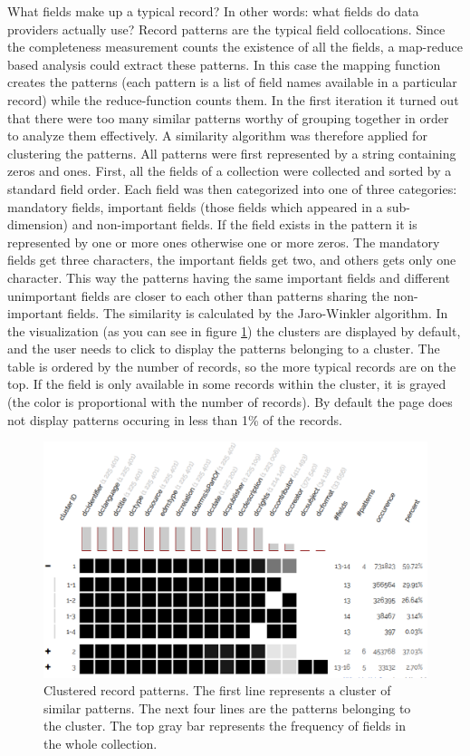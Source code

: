 What fields make up a typical record? In other words: what fields do data providers actually use? Record patterns are the typical field collocations. Since the completeness measurement counts the existence of all the fields, a map-reduce based analysis could extract these patterns. In this case the mapping function creates the patterns (each pattern is a list of field names available in a particular record) while the reduce-function counts them. In the first iteration it turned out that there were too many similar patterns worthy of grouping together in order to analyze them effectively. A similarity algorithm was therefore applied for clustering the patterns. All patterns were first represented by a string containing zeros and ones. First, all the fields of a collection were collected and sorted by a standard field order. Each field was then categorized into one of three categories: mandatory fields, important fields (those fields which appeared in a sub-dimension) and non-important fields. If the field exists in the pattern it is represented by one or more ones otherwise one or more zeros. The mandatory fields get three characters, the important fields get two, and others gets only one character. This way the patterns having the same important fields and different unimportant fields are closer to each other than patterns sharing the non-important fields. The similarity is calculated by the Jaro-Winkler algorithm. In the visualization (as you can see in figure \ref{figure:patterns}) the clusters are displayed by default, and the user needs to click to display the patterns belonging to a cluster. The table is ordered by the number of records, so the more typical records are on the top. If the field is only available in some records within the cluster, it is grayed (the color is proportional with the number of records). By default the page does not display patterns occuring in less than 1\% of the records.

\begin{figure}[ht]
\includegraphics[width=\textwidth]{images/chapter02/clustered-patternsv05.eps}
\centering
\caption{Clustered record patterns. The first line represents a cluster of similar patterns. The next four lines are the patterns belonging to the cluster. The top gray bar represents the frequency of fields in the whole collection.}
\label{figure:patterns}
\end{figure}


